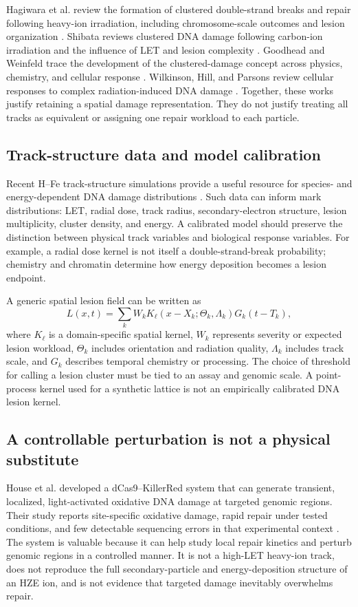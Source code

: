 \documentclass[11pt,a4paper,oneside]{article}
\begin{document}
Hagiwara et al. review the formation of clustered double-strand breaks and repair following heavy-ion irradiation, including chromosome-scale outcomes and lesion organization \citep{Hagiwara2019}. Shibata reviews clustered DNA damage following carbon-ion irradiation and the influence of LET and lesion complexity \citep{Shibata2022}. Goodhead and Weinfeld trace the development of the clustered-damage concept across physics, chemistry, and cellular response \citep{Goodhead2024}. Wilkinson, Hill, and Parsons review cellular responses to complex radiation-induced DNA damage \citep{Wilkinson2023}. Together, these works justify retaining a spatial damage representation. They do not justify treating all tracks as equivalent or assigning one repair workload to each particle.

\subsection{Track-structure data and model calibration}
Recent H--Fe track-structure simulations provide a useful resource for species- and energy-dependent DNA damage distributions \citep{Huang2026}. Such data can inform mark distributions: LET, radial dose, track radius, secondary-electron structure, lesion multiplicity, cluster density, and energy. A calibrated model should preserve the distinction between physical track variables and biological response variables. For example, a radial dose kernel is not itself a double-strand-break probability; chemistry and chromatin determine how energy deposition becomes a lesion endpoint.

A generic spatial lesion field can be written as
\begin{equation}\label{eq:lesion-field}
L(x,t)=\sum_k W_k K_{\ell}\!\left(x-X_k;\Theta_k,\Lambda_k\right)G_k(t-T_k),
\end{equation}
where \(K_\ell\) is a domain-specific spatial kernel, \(W_k\) represents severity or expected lesion workload, \(\Theta_k\) includes orientation and radiation quality, \(\Lambda_k\) includes track scale, and \(G_k\) describes temporal chemistry or processing. The choice of threshold for calling a lesion cluster must be tied to an assay and genomic scale. A point-process kernel used for a synthetic lattice is not an empirically calibrated DNA lesion kernel.

\subsection{A controllable perturbation is not a physical substitute}
House et al. developed a dCas9--KillerRed system that can generate transient, localized, light-activated oxidative DNA damage at targeted genomic regions. Their study reports site-specific oxidative damage, rapid repair under tested conditions, and few detectable sequencing errors in that experimental context \citep{House2020}. The system is valuable because it can help study local repair kinetics and perturb genomic regions in a controlled manner. It is not a high-LET heavy-ion track, does not reproduce the full secondary-particle and energy-deposition structure of an HZE ion, and is not evidence that targeted damage inevitably overwhelms repair.
\end{document}
